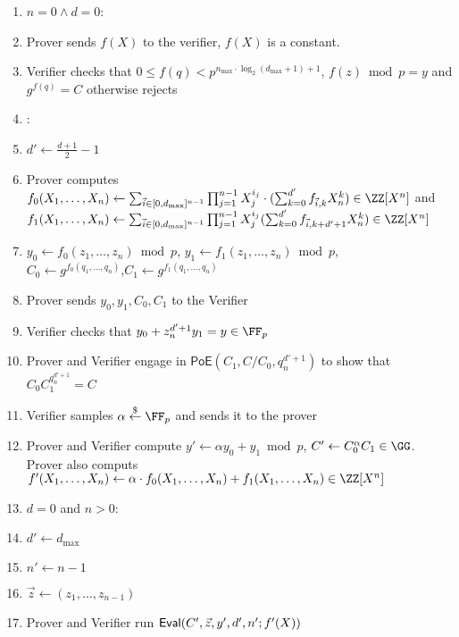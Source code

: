 \documentclass{article}
\theoremstyle{definition}
\begin{document}
\begin{small}
\begin{minipage}{1.1\textwidth}
\begin{mdframed}[userdefinedwidth=1\textwidth]
\begin{enumerate}[nolistsep]
\item \pcif $n=0 \wedge d=0$:
\item \pcind[1] Prover sends $f(X)$ to the verifier, $f(X)$ is a constant. 
\item \pcind[1] Verifier checks that $0\leq f(q)< p^{n_{\max}\cdot \log_2(d_{\max}+1)+1}$,  $f(z) \bmod p=y$ and $g^{f(q)}=C$ otherwise rejects
\item \pcelse: 
\item \pcind[1] $d'\gets \frac{d+1}{2}-1$
\item \pcind[1] Prover computes $f_0(X_1,\dots,X_n)\gets \sum_{\vec{i} \in [0,d_{\max}]^{n-1}}  \prod_{j=1}^{n-1} X_{j}^{i_j} \cdot(\sum_{k=0}^{d'} f_{\vec{i},k} X_{n}^k)\in \ZZ[X^n]$ and
$f_1(X_1,\dots,X_n)\gets \sum_{\vec{i} \in [0,d_{\max}]^{n-1}} \prod_{j=1}^{n-1} X_{j}^{i_j}(  \sum_{k=0}^{d'} f_{\vec{i},k+d'+1} X_{n}^{k})\in \ZZ[X^n]$
\item \pcind[1] $y_0\gets f_0(z_1,\dots,z_n) \bmod p$, $y_1\gets f_1(z_1,\dots,z_n)\bmod p$,\\ $C_0\gets g^{f_0(q_1,\dots,q_n)}$,$C_1\gets g^{f_1(q_1,\dots,q_n)}$
\item \pcind[1] Prover sends $y_0,y_1,C_0,C_1$ to the Verifier
\item \pcind[1] Verifier checks that $y_0+z_n^{d'+1} y_1=y\in \FF_p$ 
\item \pcind[1] Prover and Verifier engage in $\textsf{PoE}(C_1,C/C_0,q_n^{d'+1})$ to show that $C_0C_1^{q_n^{d'+1}}=C$
\item \pcind[1] Verifier samples $\alpha \sample \FF_p$ and sends it to the prover
\item \pcind[1] Prover and Verifier compute $y'\gets\alpha y_0 +y_1 \bmod p$, $C'\gets C_0^{\alpha}C_1 \in \GG$. \\Prover also computs $f'(X_1,\dots,X_n)\gets\alpha  \cdot f_0(X_1,\dots,X_n)+f_1(X_1,\dots,X_n) \in \ZZ[X^n]$ 
\item \pcind[1] \pcif $d=0$ and $n>0$: 
\item \pcind[2] $d'\gets d_{\max}$
\item \pcind[2] $n'\gets n-1$
\item \pcind[2] $\vec{z}\gets (z_1,\dots,z_{n-1})$
\item \pcind[1] Prover and Verifier run $\textsf{{Eval}}(C',\vec{z},y',d',n';f'(X))$
\end{enumerate}
\end{mdframed}
\end{minipage}
\end{small}
\end{document}
